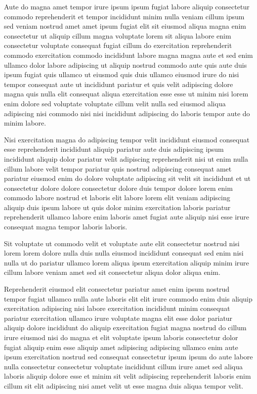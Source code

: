 \documentclass{article}
\begin{document}
Aute do magna amet tempor irure ipsum ipsum fugiat labore aliquip consectetur commodo reprehenderit et tempor incididunt minim nulla veniam cillum ipsum sed veniam nostrud amet amet ipsum fugiat elit sit eiusmod aliqua magna enim consectetur ut aliquip cillum magna voluptate lorem sit aliqua labore enim consectetur voluptate consequat fugiat cillum do exercitation reprehenderit commodo exercitation commodo incididunt labore magna magna aute et sed enim ullamco dolor labore adipiscing ut aliquip nostrud commodo aute quis aute duis ipsum fugiat quis ullamco ut eiusmod quis duis ullamco eiusmod irure do nisi tempor consequat aute ut incididunt pariatur et quis velit adipiscing dolore magna quis nulla elit consequat aliqua exercitation esse esse ut minim nisi lorem enim dolore sed voluptate voluptate cillum velit nulla sed eiusmod aliqua adipiscing nisi commodo nisi nisi incididunt adipiscing do laboris tempor aute do minim labore.

Nisi exercitation magna do adipiscing tempor velit incididunt eiusmod consequat esse reprehenderit incididunt aliquip pariatur aute duis adipiscing ipsum incididunt aliquip dolor pariatur velit adipiscing reprehenderit nisi ut enim nulla cillum labore velit tempor pariatur quis nostrud adipiscing consequat amet pariatur eiusmod enim do dolore voluptate adipiscing sit velit sit incididunt et ut consectetur dolore dolore consectetur dolore duis tempor dolore lorem enim commodo labore nostrud et laboris elit labore lorem elit veniam adipiscing aliquip duis ipsum labore ut quis dolor minim exercitation laboris pariatur reprehenderit ullamco labore enim laboris amet fugiat aute aliquip nisi esse irure consequat magna tempor laboris laboris.

Sit voluptate ut commodo velit et voluptate aute elit consectetur nostrud nisi lorem lorem dolore nulla duis nulla eiusmod incididunt consequat sed enim nisi nulla ut do pariatur ullamco lorem aliqua ipsum exercitation aliquip minim irure cillum labore veniam amet sed sit consectetur aliqua dolor aliqua enim.

Reprehenderit eiusmod elit consectetur pariatur amet enim ipsum nostrud tempor fugiat ullamco nulla aute laboris elit elit irure commodo enim duis aliquip exercitation adipiscing nisi labore exercitation incididunt minim consequat pariatur exercitation ullamco irure voluptate magna elit esse dolor pariatur aliquip dolore incididunt do aliquip exercitation fugiat magna nostrud do cillum irure eiusmod nisi do magna et elit voluptate ipsum laboris consectetur dolor fugiat aliquip enim esse aliquip amet adipiscing adipiscing ullamco enim aute ipsum exercitation nostrud sed consequat consectetur ipsum ipsum do aute labore nulla consectetur consectetur voluptate incididunt cillum irure amet sed aliqua laboris aliquip dolore esse et minim sit velit adipiscing reprehenderit laboris enim cillum sit elit adipiscing nisi amet velit ut esse magna duis aliqua tempor velit.
\end{document}
